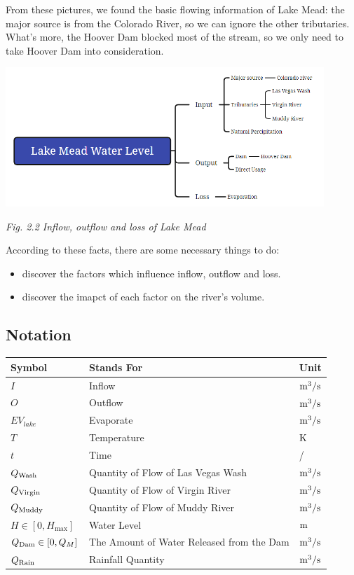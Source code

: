 \documentclass[12pt]{article}
\theoremstyle{definition}
\theoremstyle{remark}
\numberwithin{equation}{section}
\begin{document}
		From these pictures, we found the basic flowing information of Lake Mead: the major source is from the Colorado River, so we can ignore the other tributaries. What's more, the Hoover Dam blocked most of the stream, so we only need to take Hoover Dam into consideration.
		
		\begin{center}
			\includegraphics[width=12cm]{2.2 Inflow, outflow and loss of Lake Mead.png}
			
			\small \textit{Fig. 2.2 Inflow, outflow and loss of Lake Mead}
		\end{center}
		
		
		According to these facts, there are some necessary things to do:
		
		\begin{itemize}
			\item discover the factors which influence inflow, outflow and loss.
			
			\item discover the imapct of each factor on the river's volume.
		\end{itemize}
			
	\subsection{Notation}
			\begin{tabular}{lll}
				\hline
				Symbol&Stands For&Unit\\
				\hline
				$I$&Inflow&$\rm{m^3/s}$\\
				$O$&Outflow&$\rm{m^3/s}$\\
				$EV_{lake}$&Evaporate&$\rm{m^3/s}$\\
				$T$&Temperature&$\rm{K}$\\
				$t$&Time&/\\
				$Q_{\rm{Wash}}$&Quantity of Flow of Las Vegas Wash&$\rm{m^3/s}$\\
				$Q_{\rm{Virgin}}$&Quantity of Flow of Virgin River&$\rm{m^3/s}$\\
				$Q_{\rm{Muddy}}$&Quantity of Flow of Muddy River&$\rm{m^3/s}$\\
				$H\in \left[0, H_{\max}\right]$&Water Level&$\rm{m}$\\
				$Q_{\rm{Dam}}\in\left[0,Q_M\right]$&The Amount of Water Released from the Dam&$\rm{m^3/s}$\\
				$Q_{\rm{Rain}}$&Rainfall Quantity&$\rm{m^3/s}$\\
				\hline
			\end{tabular}	
		
\end{document}
